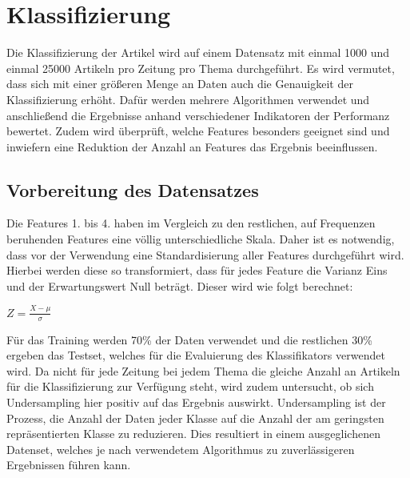 \section{Klassifizierung}
Die Klassifizierung der Artikel wird auf einem Datensatz mit einmal 1000 und einmal 25000 Artikeln pro Zeitung pro Thema durchgeführt. Es wird vermutet, dass sich mit einer größeren Menge an Daten auch die Genauigkeit der Klassifizierung erhöht. Dafür werden mehrere Algorithmen verwendet und anschließend die Ergebnisse anhand verschiedener Indikatoren der Performanz bewertet. Zudem wird überprüft, welche Features besonders geeignet sind und inwiefern eine Reduktion der Anzahl an Features das Ergebnis beeinflussen.


\subsection{Vorbereitung des Datensatzes}
Die Features 1. bis 4. haben im Vergleich zu den restlichen, auf Frequenzen beruhenden Features eine völlig unterschiedliche Skala. Daher ist es notwendig, dass vor der Verwendung eine Standardisierung aller Features durchgeführt wird. Hierbei werden diese so transformiert, dass für jedes Feature die Varianz Eins und der Erwartungswert Null beträgt. Dieser wird wie folgt berechnet:

\(Z = \frac{X-\mu}{\sigma}\)

Für das Training werden 70\% der Daten verwendet und die restlichen 30\% ergeben das Testset, welches für die Evaluierung des Klassifikators verwendet wird. Da nicht für jede Zeitung bei jedem Thema die gleiche Anzahl an Artikeln für die Klassifizierung zur Verfügung steht, wird zudem untersucht, ob sich Undersampling hier positiv auf das Ergebnis auswirkt. Undersampling ist der Prozess, die Anzahl der Daten jeder Klasse auf die Anzahl der am geringsten repräsentierten Klasse zu reduzieren. Dies resultiert in einem ausgeglichenen Datenset, welches je nach verwendetem Algorithmus zu zuverlässigeren Ergebnissen führen kann.

